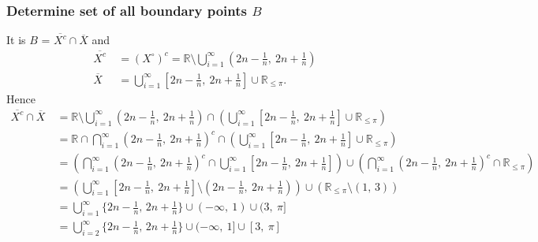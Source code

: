 \documentclass{article}
\begin{document}
\subsubsection*{Determine set of all boundary points $B$}
It is $B$ = $\overline{X^{c}} \cap \overline{X}$ and \\
\begin{align*}
  \overline{X^{c}} \ & = (X^{\circ})^{c} = \mathbb{R} \setminus \bigcup_{i=1}^{\infty} (2n - \frac{1}{n} ,\ 2n + \frac{1}{n})\\
  \overline{X} \ & = \bigcup_{i=1}^{\infty} [2n - \frac{1}{n},\ 2n + \frac{1}{n}] \cup \mathbb{R}_{\leq \pi}.
\end{align*}
Hence
\begin{align*}
  \overline{X^{c}} \cap \overline{X} \ & =  \mathbb{R} \setminus \bigcup_{i=1}^{\infty} (2n - \frac{1}{n} ,\ 2n + \frac{1}{n}) \cap \left( \bigcup_{i=1}^{\infty} [2n - \frac{1}{n},\ 2n + \frac{1}{n}] \cup \mathbb{R}_{\leq \pi} \right) \\
  \ & = \mathbb{R} \cap \bigcap_{i=1}^{\infty} (2n - \frac{1}{n} ,\ 2n + \frac{1}{n})^{c} \cap \left( \bigcup_{i=1}^{\infty} [2n - \frac{1}{n},\ 2n + \frac{1}{n}] \cup \mathbb{R}_{\leq \pi} \right) \\
  \ & = \left( \bigcap_{i=1}^{\infty} (2n - \frac{1}{n} ,\ 2n + \frac{1}{n})^{c} \cap  \bigcup_{i=1}^{\infty} [2n - \frac{1}{n},\ 2n + \frac{1}{n}] \right) \cup \left( \bigcap_{i=1}^{\infty} (2n - \frac{1}{n} ,\ 2n + \frac{1}{n})^{c} \cap \mathbb{R}_{\leq \pi} \right) \\
  \ & =  \left( \bigcup_{i=1}^{\infty} [2n - \frac{1}{n},\ 2n + \frac{1}{n}] \setminus (2n - \frac{1}{n} ,\ 2n + \frac{1}{n}) \right) \cup \left( \mathbb{R}_{\leq \pi} \setminus (1,\, 3) \right) \\
  \ & = \bigcup_{i=1}^{\infty} \{2n - \frac{1}{n},\, 2n + \frac{1}{n}\} \cup (-\infty ,\ 1) \cup (3 ,\ \pi] \\
  \ & = \bigcup_{i=2}^{\infty} \{2n - \frac{1}{n},\, 2n + \frac{1}{n}\} \cup (-\infty ,\ 1] \cup [3 ,\ \pi]
\end{align*}
\end{document}
